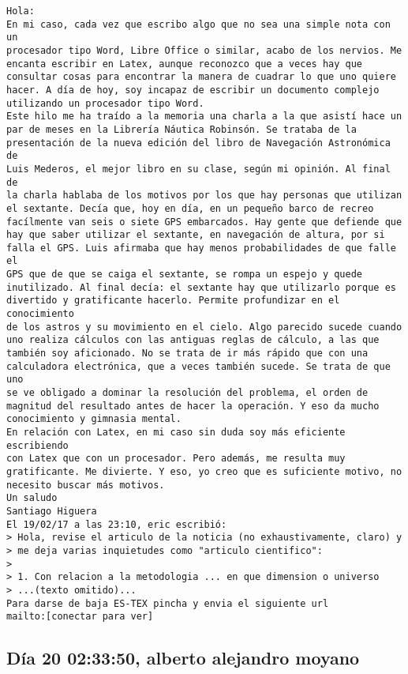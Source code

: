 \documentclass[a4paper,10pt]{article}
\begin{document}
\begin{lstlisting}
Hola:
En mi caso, cada vez que escribo algo que no sea una simple nota con un 
procesador tipo Word, Libre Office o similar, acabo de los nervios. Me 
encanta escribir en Latex, aunque reconozco que a veces hay que 
consultar cosas para encontrar la manera de cuadrar lo que uno quiere 
hacer. A día de hoy, soy incapaz de escribir un documento complejo 
utilizando un procesador tipo Word.
Este hilo me ha traído a la memoria una charla a la que asistí hace un 
par de meses en la Librería Náutica Robinsón. Se trataba de la 
presentación de la nueva edición del libro de Navegación Astronómica de 
Luis Mederos, el mejor libro en su clase, según mi opinión. Al final de 
la charla hablaba de los motivos por los que hay personas que utilizan 
el sextante. Decía que, hoy en día, en un pequeño barco de recreo 
facílmente van seis o siete GPS embarcados. Hay gente que defiende que 
hay que saber utilizar el sextante, en navegación de altura, por si 
falla el GPS. Luis afirmaba que hay menos probabilidades de que falle el 
GPS que de que se caiga el sextante, se rompa un espejo y quede 
inutilizado. Al final decía: el sextante hay que utilizarlo porque es 
divertido y gratificante hacerlo. Permite profundizar en el conocimiento 
de los astros y su movimiento en el cielo. Algo parecido sucede cuando 
uno realiza cálculos con las antiguas reglas de cálculo, a las que 
también soy aficionado. No se trata de ir más rápido que con una 
calculadora electrónica, que a veces también sucede. Se trata de que uno 
se ve obligado a dominar la resolución del problema, el orden de 
magnitud del resultado antes de hacer la operación. Y eso da mucho 
conocimiento y gimnasia mental.
En relación con Latex, en mi caso sin duda soy más eficiente escribiendo 
con Latex que con un procesador. Pero además, me resulta muy 
gratificante. Me divierte. Y eso, yo creo que es suficiente motivo, no 
necesito buscar más motivos.
Un saludo
Santiago Higuera
El 19/02/17 a las 23:10, eric escribió:
> Hola, revise el articulo de la noticia (no exhaustivamente, claro) y 
> me deja varias inquietudes como "articulo cientifico":
>
> 1. Con relacion a la metodologia ... en que dimension o universo 
> ...(texto omitido)...
Para darse de baja ES-TEX pincha y envia el siguiente url
mailto:[conectar para ver]

\end{lstlisting}

\subsection{Día 20 02:33:50, alberto alejandro moyano}
\end{document}
